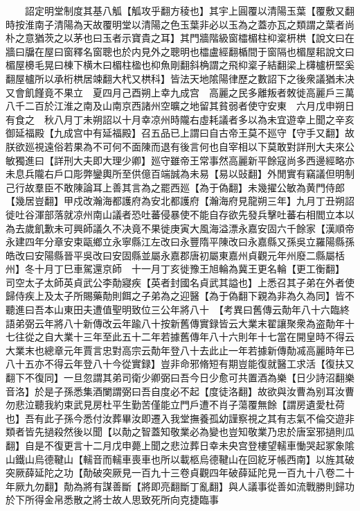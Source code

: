 　　詔定明堂制度其基八觚【觚攻乎翻方稜也】其宇上圓覆以清陽玉葉【覆敷又翻時按淮南子清陽為天故覆明堂以清陽之色玉葉非必以玉為之蓋亦瓦之類謂之葉者尚朴之意猶茨之以茅也曰玉者示寶貴之耳】其門牆階級窗櫺楣柱枊楶枅栱【說文曰在牆曰牖在屋曰窗釋名窗聰也於内見外之聰明也櫺盧經翻楯間于窗隔也楣屋耜說文曰楣屋櫋毛晃曰棟下横木曰楣柱楹也枊魚剛翻斜桷謂之飛枊楶子結翻梁上欂櫨枅堅奚翻屋櫨所以承桁栱居竦翻大杙又栱科】皆法天地隂陽律歷之數詔下之後衆議猶未决又會飢饉竟不果立　夏四月己酉朔上幸九成宫　高麗之民多離叛者敇徙高麗戶三萬八千二百於江淮之南及山南京西諸州空曠之地留其貧弱者使守安東　六月戊申朔日有食之　秋八月丁未朔詔以十月幸凉州時隴右虛耗議者多以為未宜遊幸上聞之辛亥御延福殿【九成宫中有延福殿】召五品已上謂曰自古帝王莫不廵守【守手又翻】故朕欲廵視遠俗若果為不可何不面陳而退有後言何也自宰相以下莫敢對詳刑大夫來公敏獨進曰【詳刑大夫即大理少卿】廵守雖帝王常事然高麗新平餘寇尚多西邊經略亦未息兵隴右戶口彫弊鑾輿所至供億百端誠為未易【易以䜴翻】外閒實有竊議但明制己行故羣臣不敢陳論耳上善其言為之罷西廵【為于偽翻】未幾擢公敏為黄門侍郎【幾居豈翻】甲戍改瀚海都護府為安北都護府【瀚海府見龍朔三年】九月丁丑朔詔徙吐谷渾部落就凉州南山議者恐吐蕃侵暴使不能自存欲先發兵擊吐蕃右相閻立本以為去歲飢歉未可興師議久不决竟不果徙庚寅大風海溢漂永嘉安固六千餘家【漢順帝永建四年分章安束甌鄉立永寧縣江左改曰永豐隋平陳改曰永嘉縣又孫吳立羅陽縣孫皓改曰安陽縣晉平吳改曰安固縣並屬永嘉郡唐初屬東嘉州貞觀元年州廢二縣屬栝州】冬十月丁巳車駕還京師　十一月丁亥徙豫王旭輪為冀王更名輪【更工衡翻】　司空太子太師英貞武公李勣寢疾【英者封國名貞武其謚也】上悉召其子弟在外者使歸侍疾上及太子所賜藥勣則餌之子弟為之迎醫【為于偽翻下親為非為久為同】皆不聽進曰吾本山東田夫遭值聖明致位三公年將八十　【考異曰舊傳云勣年八十六臨終語弟弼云年將八十新傳改云年踰八十按新舊傳實録皆云大業末翟讓聚衆為盗勣年十七往從之自大業十三年至此五十二年若據舊傳年八十六則年十七當在開皇時不得云大業末也總章元年賈言忠對高宗云勣年登八十去此止一年若據新傳勣㓕高麗時年已八十五亦不得云年登八十今從實録】豈非命邪脩短有期豈能復就醫工求活【復扶又翻下不復同】一旦忽謂其弟司衛少卿弼曰吾今日少愈可共置酒為樂【日少詩沼翻樂音洛】於是子孫悉集酒闌謂弼曰吾自度必不起【度徒洛翻】故欲與汝曹為别耳汝曹勿悲泣聽我約束武見房杜平生勤苦僅能立門戶遭不肖子蕩覆無餘【謂房遺愛杜荷也】吾有此子孫今悉付汝葬畢汝即遷入我堂撫養孤幼謹察視之其有志氣不倫交遊非類者皆先撾殺然後以聞【以勣之智蓋知敬業必為變也豈知敬業乃忠於唐室邪撾則瓜翻】自是不復更言十二月戊申薨上聞之悲泣葬日幸未央宫登樓望轜車慟哭起冢象隂山鐵山烏德鞬山【轜音而轜車喪車也所以載柩烏德鞬山在回紇牙帳西南】以旌其破突厥薛延陀之功【勣破突厥見一百九十三卷貞觀四年破薛延陀見一百九十八卷二十年厥九勿翻】勣為將有謀善斷【將即亮翻斷丁亂翻】與人議事從善如流戰勝則歸功於下所得金帛悉散之將士故人思致死所向克捷臨事